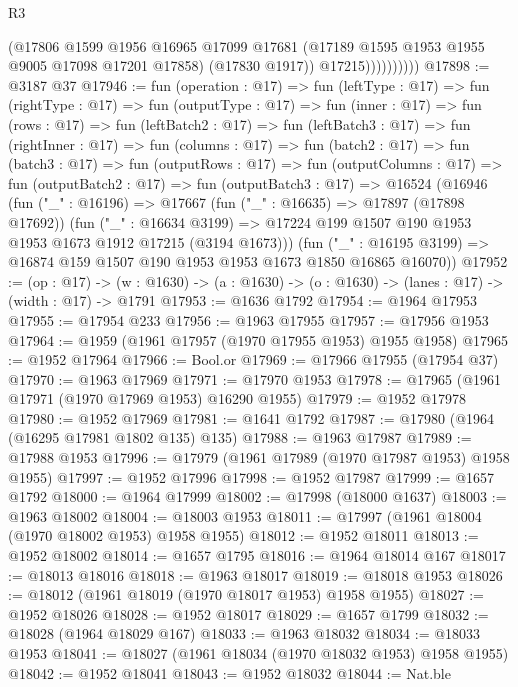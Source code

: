 \begin{lexlean}{R3}
\begin{coremodule}
                        (@17806
                          @1599
                          @1956
                          @16965
                          @17099
                          @17681
                          (@17189 @1595 @1953 @1955 @9005 @17098 @17201 @17858)
                          (@17830 @1917))
                        @17215))))))))))
@17898 := @3187 @37
@17946 := fun (operation : @17) =>
  fun (leftType : @17) =>
  fun (rightType : @17) =>
  fun (outputType : @17) =>
  fun (inner : @17) =>
  fun (rows : @17) =>
  fun (leftBatch2 : @17) =>
  fun (leftBatch3 : @17) =>
  fun (rightInner : @17) =>
  fun (columns : @17) =>
  fun (batch2 : @17) =>
  fun (batch3 : @17) =>
  fun (outputRows : @17) =>
  fun (outputColumns : @17) =>
  fun (outputBatch2 : @17) =>
  fun (outputBatch3 : @17) =>
  @16524
    (@16946
      (fun ("_" : @16196) =>
      @17667
        (fun ("_" : @16635) => @17897 (@17898 @17692))
        (fun ("_" : @16634 @3199) =>
        @17224 @199 @1507 @190 @1953 @1953 @1673 @1912 @17215 (@3194 @1673)))
      (fun ("_" : @16195 @3199) => @16874 @159 @1507 @190 @1953 @1953 @1673 @1850 @16865 @16070))
@17952 := (op : @17) ->
  (w : @1630) -> (a : @1630) -> (o : @1630) -> (lanes : @17) -> (width : @17) -> @1791
@17953 := @1636 @1792
@17954 := @1964 @17953
@17955 := @17954 @233
@17956 := @1963 @17955
@17957 := @17956 @1953
@17964 := @1959 (@1961 @17957 (@1970 @17955 @1953) @1955 @1958)
@17965 := @1952 @17964
@17966 := Bool.or
@17969 := @17966 @17955 (@17954 @37)
@17970 := @1963 @17969
@17971 := @17970 @1953
@17978 := @17965 (@1961 @17971 (@1970 @17969 @1953) @16290 @1955)
@17979 := @1952 @17978
@17980 := @1952 @17969
@17981 := @1641 @1792
@17987 := @17980 (@1964 (@16295 @17981 @1802 @135) @135)
@17988 := @1963 @17987
@17989 := @17988 @1953
@17996 := @17979 (@1961 @17989 (@1970 @17987 @1953) @1958 @1955)
@17997 := @1952 @17996
@17998 := @1952 @17987
@17999 := @1657 @1792
@18000 := @1964 @17999
@18002 := @17998 (@18000 @1637)
@18003 := @1963 @18002
@18004 := @18003 @1953
@18011 := @17997 (@1961 @18004 (@1970 @18002 @1953) @1958 @1955)
@18012 := @1952 @18011
@18013 := @1952 @18002
@18014 := @1657 @1795
@18016 := @1964 @18014 @167
@18017 := @18013 @18016
@18018 := @1963 @18017
@18019 := @18018 @1953
@18026 := @18012 (@1961 @18019 (@1970 @18017 @1953) @1958 @1955)
@18027 := @1952 @18026
@18028 := @1952 @18017
@18029 := @1657 @1799
@18032 := @18028 (@1964 @18029 @167)
@18033 := @1963 @18032
@18034 := @18033 @1953
@18041 := @18027 (@1961 @18034 (@1970 @18032 @1953) @1958 @1955)
@18042 := @1952 @18041
@18043 := @1952 @18032
@18044 := Nat.ble

\end{coremodule}
\end{lexlean}
